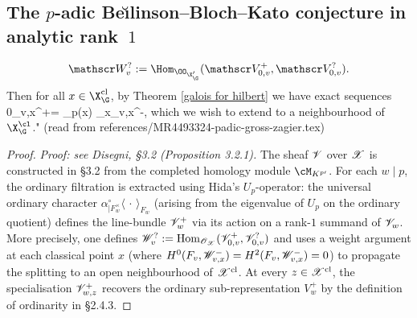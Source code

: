\subsection{The $p$-adic Be\u\i linson--Bloch--Kato conjecture in analytic rank~$1$}

$$\cW_{v}^{?}:= \Hom_{\OO_{\X'_{\G}}}(\cV_{0,v}^{+}, \cV_{0,v}^{?}).$$ Then for all $x\in \X_{\G}^{\rm cl}$, by Theorem \ref{galois for hilbert} we have exact sequences
\beq {}
0\to \cW_{v,x}^{+}= \Q_{p}(x) \to \cW_{x}\to \cW_{v,x}^{-},
\eeq
which we  wish to extend to a neighbourhood of $\X_{\G}^{\cl}$." (read from references/MR4493324-padic-gross-zagier.tex)
\begin{proof}
  \uses{}
  \textit{Proof: see Disegni, §3.2 (Proposition 3.2.1).}
  The sheaf $\mathscr{V}$ over $\mathscr{X}$ is constructed in §3.2 from the completed homology module
  $\cM_{K^{p\prime}}$.  For each $w \mid p$, the ordinary filtration is extracted using
  Hida's $U_p$-operator: the universal ordinary character $\alpha^\circ_{|F_w^\times}
  \langle\,\cdot\,\rangle_{F_w}$ (arising from the eigenvalue of $U_p$ on the ordinary
  quotient) defines the line-bundle $\mathscr{V}_w^+$ via its action on a rank-$1$ summand of
  $\mathscr{V}_w$.  More precisely, one defines $\mathscr{W}_v^? :=
  \mathrm{Hom}_{\mathscr{O}_{\mathscr{X}}}(\mathscr{V}_{0,v}^+, \mathscr{V}_{0,v}^?)$ and uses a weight argument at each
  classical point $x$ (where $H^0(F_v, \mathscr{W}_{v,x}^-)= H^2(F_v, \mathscr{W}_{v,x}^-)=0$) to
  propagate the splitting to an open neighbourhood of $\mathscr{X}^{\mathrm{cl}}$.  At every
  $z \in \mathscr{X}^{\mathrm{cl}}$, the specialisation $\mathscr{V}_{w,z}^+$ recovers the ordinary
  sub-representation $V_w^+$ by the definition of ordinarity in §2.4.3.
\end{proof}



